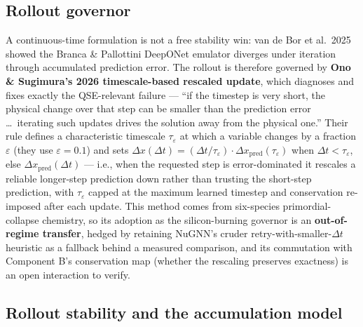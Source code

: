 \documentclass[11pt]{article}
\begin{document}
\subsection{Rollout governor}

A continuous-time formulation is not a free stability win: van de Bor et al.\ 2025 showed the Branca \& Pallottini DeepONet emulator diverges under iteration through accumulated prediction error. The rollout is therefore governed by \textbf{Ono \& Sugimura's 2026 timescale-based rescaled update}, which diagnoses and fixes exactly the QSE-relevant failure --- ``if the timestep is very short, the physical change over that step can be smaller than the prediction error \ldots\ iterating such updates drives the solution away from the physical one.'' Their rule defines a characteristic timescale $\tau_\varepsilon$ at which a variable changes by a fraction $\varepsilon$ (they use $\varepsilon = 0.1$) and sets $\Delta x(\Delta t) = (\Delta t/\tau_\varepsilon)\cdot\Delta x_{\mathrm{pred}}(\tau_\varepsilon)$ when $\Delta t < \tau_\varepsilon$, else $\Delta x_{\mathrm{pred}}(\Delta t)$ --- i.e., when the requested step is error-dominated it rescales a reliable longer-step prediction down rather than trusting the short-step prediction, with $\tau_\varepsilon$ capped at the maximum learned timestep and conservation re-imposed after each update. This method comes from six-species primordial-collapse chemistry, so its adoption as the silicon-burning governor is an \textbf{out-of-regime transfer}, hedged by retaining NuGNN's cruder retry-with-smaller-$\Delta t$ heuristic as a fallback behind a measured comparison, and its commutation with Component B's conservation map (whether the rescaling preserves exactness) is an open interaction to verify.

\subsection{Rollout stability and the accumulation model}
\end{document}
